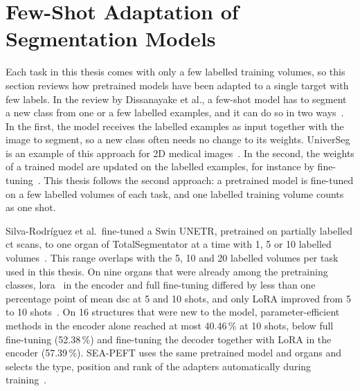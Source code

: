 \section{Few-Shot Adaptation of Segmentation Models}
\label{sec:sota-few-shot}

Each task in this thesis comes with only a few labelled training volumes, so this section reviews how pretrained models have been adapted to a single target with few labels.
In the review by Dissanayake et al., a few-shot model has to segment a new class from one or a few labelled examples, and it can do so in two ways~\cite[Sec.~2.2]{theekshana26fewshot}.
In the first, the model receives the labelled examples as input together with the image to segment, so a new class often needs no change to its weights.
UniverSeg is an example of this approach for 2D medical images~\cite{universeg}.
In the second, the weights of a trained model are updated on the labelled examples, for instance by fine-tuning~\cite[Sec.~2.2]{theekshana26fewshot}.
This thesis follows the second approach: a pretrained model is fine-tuned on a few labelled volumes of each task, and one labelled training volume counts as one shot.

Silva-Rodríguez et al.\ fine-tuned a Swin UNETR, pretrained on partially labelled \gls{ct} scans, to one organ of TotalSegmentator at a time with 1, 5 or 10 labelled volumes~\cite{silvarodriguez2023fseft}.
This range overlaps with the 5, 10 and 20 labelled volumes per task used in this thesis.
On nine organs that were already among the pretraining classes, \gls{lora}~\cite{hu2022lora} in the encoder and full fine-tuning differed by less than one percentage point of mean \gls{dsc} at 5 and 10 shots, and only LoRA improved from 5 to 10 shots~\cite{silvarodriguez2023fseft}.
On 16 structures that were new to the model, parameter-efficient methods in the encoder alone reached at most 40.46\,\% at 10 shots, below full fine-tuning (52.38\,\%) and fine-tuning the decoder together with LoRA in the encoder (57.39\,\%).
SEA-PEFT uses the same pretrained model and organs and selects the type, position and rank of the adapters automatically during training~\cite{ly2026seapeft}.

